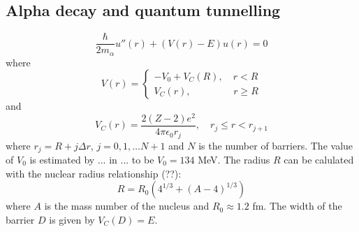 \documentclass[twocolumn]{article}
\begin{document}
\begin{large}
\section*{Alpha decay and quantum tunnelling}
\blindtext
\begin{equation}
    \label{26mar1229}
    \frac{\hbar}{2m_\alpha}u''(r) + (V(r)-E)u(r) = 0
\end{equation}
where 
\begin{equation}
    V(r) = 
    \begin{cases}
        -V_0 + V_C(R), \quad r < R \\
        V_C(r), \qquad\qquad\,\, r\geq R
    \end{cases}
\end{equation}
and 
\begin{equation}
    V_C(r) = \frac{2(Z-2)e^2}{4\pi\epsilon_0r_j},\quad r_j\leq r < r_{j+1}
\end{equation}
where $r_j = R+j\Delta r$, $j=0,1,\dots N+1$ and $N$ is the number of barriers. The value of $V_0$ is estimated by ... in ... to be $V_0 = 134$ MeV. The radius $R$ can be calulated with the nuclear radius relationship (??):
\begin{equation}
    R = R_0\left(4^{1/3} + (A-4)^{1/3}\right)
\end{equation}
where $A$ is the mass number of the nucleus and $R_0\approx 1.2$ fm. The width of the barrier $D$ is given by $V_C(D) = E$.


\end{large}
\end{document}

